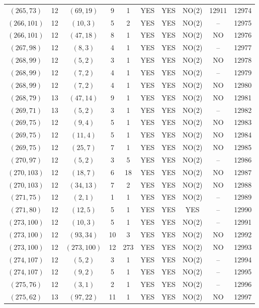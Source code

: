 \begin{longtable}{|c|c|c|c|c|c|c|c|c|c|}
$(265, 73)$ & 12 & $(69, 19)$ & 9 & 1 & YES & YES & NO(2) & 12911 & 12974\\
$(266, 101)$ & 12 & $(10, 3)$ & 5 & 2 & YES & YES & NO(2) & -- & 12975\\
$(266, 101)$ & 12 & $(47, 18)$ & 8 & 1 & YES & YES & NO(2) & NO & 12976\\
$(267, 98)$ & 12 & $(8, 3)$ & 4 & 1 & YES & YES & NO(2) & -- & 12977\\
$(268, 99)$ & 12 & $(5, 2)$ & 3 & 1 & YES & YES & NO(2) & NO & 12978\\
$(268, 99)$ & 12 & $(7, 2)$ & 4 & 1 & YES & YES & NO(2) & -- & 12979\\
$(268, 99)$ & 12 & $(7, 2)$ & 4 & 1 & YES & YES & NO(2) & NO & 12980\\
$(268, 79)$ & 13 & $(47, 14)$ & 9 & 1 & YES & YES & NO(2) & NO & 12981\\
$(269, 71)$ & 13 & $(5, 2)$ & 3 & 1 & YES & YES & NO(2) & -- & 12982\\
$(269, 75)$ & 12 & $(9, 4)$ & 5 & 1 & YES & YES & NO(2) & NO & 12983\\
$(269, 75)$ & 12 & $(11, 4)$ & 5 & 1 & YES & YES & NO(2) & NO & 12984\\
$(269, 75)$ & 12 & $(25, 7)$ & 7 & 1 & YES & YES & NO(2) & NO & 12985\\
$(270, 97)$ & 12 & $(5, 2)$ & 3 & 5 & YES & YES & NO(2) & -- & 12986\\
$(270, 103)$ & 12 & $(18, 7)$ & 6 & 18 & YES & YES & NO(2) & NO & 12987\\
$(270, 103)$ & 12 & $(34, 13)$ & 7 & 2 & YES & YES & NO(2) & NO & 12988\\
$(271, 75)$ & 12 & $(2, 1)$ & 1 & 1 & YES & YES & NO(2) & -- & 12989\\
$(271, 80)$ & 12 & $(12, 5)$ & 5 & 1 & YES & YES & YES & -- & 12990\\
$(273, 100)$ & 12 & $(10, 3)$ & 5 & 1 & YES & YES & NO(2) & -- & 12991\\
$(273, 100)$ & 12 & $(93, 34)$ & 10 & 3 & YES & YES & NO(2) & NO & 12992\\
$(273, 100)$ & 12 & $(273, 100)$ & 12 & 273 & YES & YES & NO(2) & NO & 12993\\
$(274, 107)$ & 12 & $(5, 2)$ & 3 & 1 & YES & YES & NO(2) & -- & 12994\\
$(274, 107)$ & 12 & $(9, 2)$ & 5 & 1 & YES & YES & NO(2) & -- & 12995\\
$(275, 76)$ & 12 & $(3, 1)$ & 2 & 1 & YES & YES & NO(2) & -- & 12996\\
$(275, 62)$ & 13 & $(97, 22)$ & 11 & 1 & YES & YES & NO(2) & NO & 12997\\

\end{longtable}
